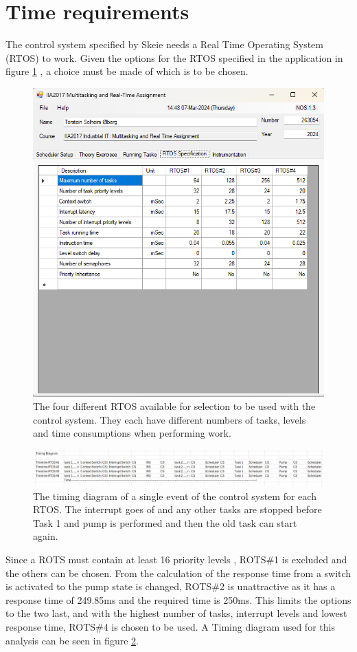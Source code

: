 \documentclass[12pt, A4paper, english]{book}
\begin{document}
		\section{Time requirements}
The control system specified by Skeie \cite{task} needs a Real Time Operating System (RTOS) to work. Given the options for the RTOS specified in the application in figure \ref{im:ROTSparams} \cite{app}, a choice must be made of which is to be chosen.
			\begin{figure}
\includegraphics[width=\linewidth]{Parameters_3}
\caption{The four different RTOS available for selection to be used with the control system. They each have different numbers of tasks, levels and time consumptions when performing work.}
\label{im:ROTSparams}
			\end{figure}
			\begin{figure}
\includegraphics[width=\linewidth]{Timing Diagram 2.png}
\caption{The timing diagram of a single event of the control system for each RTOS. The interrupt goes of and any other tasks are stopped before Task 1 and pump is performed and then the old task can start again.}
\label{im:TimingDiag}
			\end{figure}
Since a ROTS must contain at least 16 priority levels \cite{LN}, ROTS\#1 is excluded and the others can be chosen. From the calculation of the response time from a switch is activated to the pump state is changed, ROTS\#2 is unattractive as it has a response time of 249.85ms and the required time is 250ms. This limits the options to the two last, and with the highest number of tasks, interrupt levels and lowest response time, ROTS\#4 is chosen to be used. A Timing diagram used for this analysis can be seen in figure \ref{im:TimingDiag}.
\end{document}
